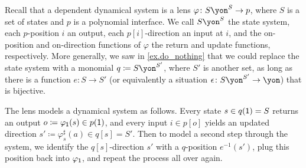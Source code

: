 \documentclass[Book-Poly]{subfiles}
\begin{document}
Recall that a dependent dynamical system is a lens $\varphi\colon S\yon^S\to p$, where $S$ is a set of states and $p$ is a polynomial interface.
We call $S\yon^S$ the state system, each $p$-position $i$ an output, each $p[i]$-direction an input at $i$, and the on-position and on-direction functions of $\varphi$ the return and update functions, respectively.
More generally, we saw in \cref{ex.do_nothing} that we could replace the state system with a monomial $q\coloneqq S\yon^{S'}$, where $S'$ is another set, as long as there is a function $e\colon S\to S'$ (or equivalently a situation $\epsilon\colon S\yon^{S'}\to\yon$) that is bijective.

The lens models a dynamical system as follows.
Every state $s\in q(\textsf{1})=S$ returns an output $o\coloneqq\varphi_{\textsf{1}}(s)\in p(\textsf{1})$, and every input $i\in p[o]$ yields an updated direction $s'\coloneqq\varphi^\sharp_s(a)\in q[s]=S'$.
Then to model a second step through the system, we identify the $q[s]$-direction $s'$ with a $q$-position $e^{-1}(s')$, plug this position back into $\varphi_{\textsf{1}}$, and repeat the process all over again.

\end{document}
